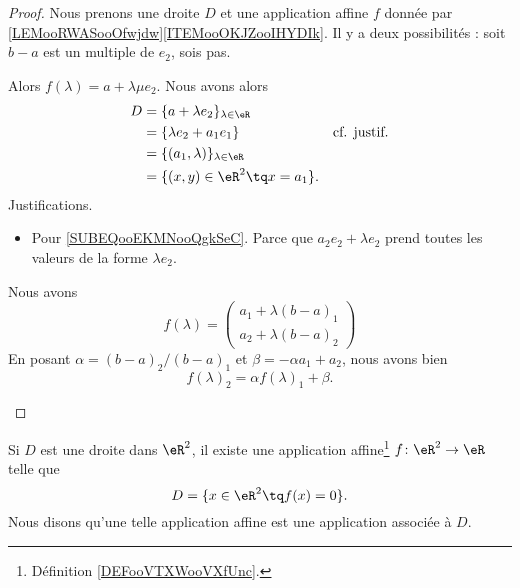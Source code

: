\begin{proof}
	Nous prenons une droite \( D\) et une application affine \( f\) donnée par \eqref{LEMooRWASooOfwjdw}\ref{ITEMooOKJZooIHYDIk}. Il y a deux possibilités : soit \( b-a\) est un multiple de \( e_2\), sois pas.
	\begin{subproof}
		\spitem[Si \( b-a=\mu e_2\)]
		Alors \( f(\lambda)=a+\lambda\mu e_2\). Nous avons alors
		\begin{subequations}
			\begin{align}
				D & =\{ a+\lambda e_2 \}_{\lambda\in \eR}                                                  \\
				  & =	\{ \lambda e_2+a_1e_1 \}              & \text{cf. justif.}		\label{SUBEQooEKMNooQgkSeC} \\
				  & = \{ (a_1,\lambda) \}_{\lambda\in \eR}                                                 \\\
				  & =\{ (x,y)\in \eR^2\tq x=a_1 \}.
			\end{align}
		\end{subequations}
		Justifications.
		\begin{itemize}
			\item
			      Pour \ref{SUBEQooEKMNooQgkSeC}. Parce que \( a_2e_2+\lambda e_2\) prend toutes les valeurs de la forme \( \lambda e_2\).
		\end{itemize}
		\spitem[Sinon]
		Nous avons
		\begin{equation}
			f(\lambda)=\begin{pmatrix}
				a_1+\lambda(b-a)_1 \\
				a_2+\lambda(b-a)_2
			\end{pmatrix}
		\end{equation}
		En posant \( \alpha=(b-a)_2/(b-a)_1\) et \( \beta=-\alpha a_1+a_2\), nous avons bien
		\begin{equation}
			f(\lambda)_2=\alpha f(\lambda)_1+\beta.
		\end{equation}
	\end{subproof}
\end{proof}

\begin{proposition}     \label{PROPooOFKXooARiQZK}
	Si \( D\) est une droite dans \( \eR^2\), il existe une application affine\footnote{Définition \ref{DEFooVTXWooVXfUnc}.} \( f\colon \eR^2\to \eR\) telle que
	\begin{equation}
		D=\{ x\in \eR^2\tq f(x)=0 \}.
	\end{equation}
	Nous disons qu'une telle application affine est une application associée à \( D\).
\end{proposition}

